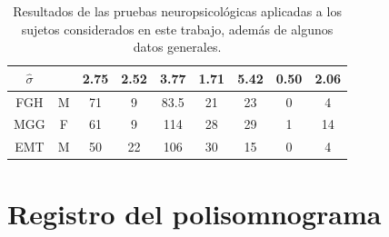 \documentclass[12pt,a4paper]{mitthesis}
\begin{document}
\begin{table}
\begin{small}
\begin{tabular}{c|ccc|ccccc}
$\widehat{\sigma}$ & 
              & 2.75 & 2.52 & 3.77    & 1.71 & 5.42 & 0.50 & 2.06\\
\hline 
\hline 
FGH    & M    & 71   & 9    & 83.5     & 21   & 23   & 0    & 4  \\
MGG    & F    & 61   & 9    & 114      & 28   & 29   & 1    & 14 \\
EMT    & M    & 50   & 22   & 106      & 30   & 15   & 0    & 4  \\
\end{tabular} 
\end{small}
\label{tab_sujetos}
\caption{Resultados de las pruebas neuropsicol\'ogicas aplicadas a los sujetos considerados en este 
trabajo, adem\'as de algunos datos generales. 
}
\end{table}




\section{Registro del polisomnograma}
\end{document}
